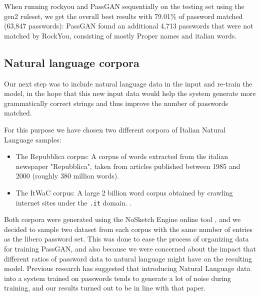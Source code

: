 When running rockyou and PassGAN sequentially on the testing set using the gen2 ruleset, we get the overall best results with 79.01\% of password matched (63,847 passwords): PassGAN found an additional 4,713 passwords that were not matched by RockYou, consisting of mostly Proper names and italian words.

\subsection{Natural language corpora} \label{subsec:nl-testing}
Our next step was to include natural language data in the input and re-train the model, in the hope that this new input data would help the system generate more grammatically correct strings and thus improve the number of passwords matched.

For this purpose we have chosen two different corpora of Italian Natural Language samples: 
\begin{itemize}
    \item The Repubblica corpus: A corpus of words extracted from the italian newspaper "Repubblica", taken from articles published between 1985 and 2000 (roughly 380 million words).\cite{repubblica_corpus}
    \item The ItWaC corpus: A large 2 billion word corpus obtained by crawling internet sites under the \texttt{.it} domain. \cite{itwac_corpus}.  
\end{itemize}
Both corpora were generated using the NoSketch Engine online tool \cite{nosketch_engine}, and we decided to sample two dataset from each corpus with the same number of entries as the libero password set. This was done to ease the process of organizing data for training PassGAN, and also because we were concerned about the impact that different ratios of password data to natural language might have on the resulting model.
Previous research \cite{Melicher2016} has suggested that introducing Natural Language data into a system trained on passwords tends to generate a lot of noise during training, and our results turned out to be in line with that paper.

